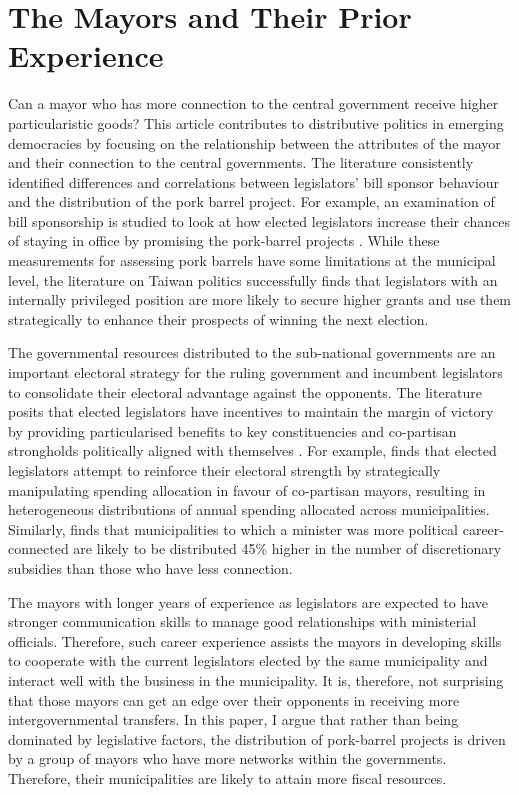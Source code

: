 \section*{\centering The Mayors and Their Prior Experience}
Can a mayor who has more connection to the central government receive higher particularistic goods? This article contributes to distributive politics in emerging democracies by focusing on the relationship between the attributes of the mayor and their connection to the central governments. The literature consistently identified differences and correlations between legislators' bill sponsor behaviour and the distribution of the pork barrel project. For example, an examination of bill sponsorship is studied to look at how elected legislators increase their chances of staying in office by promising the pork-barrel projects \citep{Luor2008,Luor2009,Luor2012,Sheng2014a,Sheng2014b}. While these measurements for assessing pork barrels have some limitations at the municipal level, the literature on Taiwan politics successfully finds that legislators with an internally privileged position are more likely to secure higher grants and use them strategically to enhance their prospects of winning the next election. 

The governmental resources distributed to the sub-national governments are an important electoral strategy for the ruling government and incumbent legislators to consolidate their electoral advantage against the opponents. The literature posits that elected legislators have incentives to maintain the margin of victory by providing particularised benefits to key constituencies and co-partisan strongholds politically aligned with themselves \citep{Calvo2004,Keefer2008,Keefer2009,Ravanilla2017,Fabre2017}. For example, \citet{Ravanilla2017} finds that elected legislators attempt to reinforce their electoral strength by strategically manipulating spending allocation in favour of co-partisan mayors, resulting in heterogeneous distributions of annual spending allocated across municipalities. Similarly, \citet{Fabre2017} finds that municipalities to which a minister was more political career-connected are likely to be distributed 45\% higher in the number of discretionary subsidies than those who have less connection. 

The mayors with longer years of experience as legislators are expected to have stronger communication skills to manage good relationships with ministerial officials. Therefore, such career experience assists the mayors in developing skills to cooperate with the current legislators elected by the same municipality and interact well with the business in the municipality. It is, therefore, not surprising that those mayors can get an edge over their opponents in receiving more intergovernmental transfers. In this paper, I argue that rather than being dominated by legislative factors, the distribution of pork-barrel projects is driven by a group of mayors who have more networks within the governments. Therefore, their municipalities are likely to attain more fiscal resources. 

